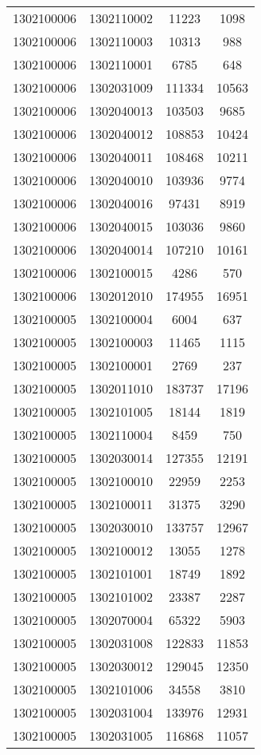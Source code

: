 \begin{longtable}{llcc}
1302100006 & 1302110002 & 11223 & 1098\\
1302100006 & 1302110003 & 10313 & 988\\
1302100006 & 1302110001 & 6785 & 648\\
1302100006 & 1302031009 & 111334 & 10563\\
1302100006 & 1302040013 & 103503 & 9685\\
1302100006 & 1302040012 & 108853 & 10424\\
1302100006 & 1302040011 & 108468 & 10211\\
1302100006 & 1302040010 & 103936 & 9774\\
1302100006 & 1302040016 & 97431 & 8919\\
1302100006 & 1302040015 & 103036 & 9860\\
1302100006 & 1302040014 & 107210 & 10161\\
1302100006 & 1302100015 & 4286 & 570\\
1302100006 & 1302012010 & 174955 & 16951\\
1302100005 & 1302100004 & 6004 & 637\\
1302100005 & 1302100003 & 11465 & 1115\\
1302100005 & 1302100001 & 2769 & 237\\
1302100005 & 1302011010 & 183737 & 17196\\
1302100005 & 1302101005 & 18144 & 1819\\
1302100005 & 1302110004 & 8459 & 750\\
1302100005 & 1302030014 & 127355 & 12191\\
1302100005 & 1302100010 & 22959 & 2253\\
1302100005 & 1302100011 & 31375 & 3290\\
1302100005 & 1302030010 & 133757 & 12967\\
1302100005 & 1302100012 & 13055 & 1278\\
1302100005 & 1302101001 & 18749 & 1892\\
1302100005 & 1302101002 & 23387 & 2287\\
1302100005 & 1302070004 & 65322 & 5903\\
1302100005 & 1302031008 & 122833 & 11853\\
1302100005 & 1302030012 & 129045 & 12350\\
1302100005 & 1302101006 & 34558 & 3810\\
1302100005 & 1302031004 & 133976 & 12931\\
1302100005 & 1302031005 & 116868 & 11057\\

\end{longtable}
